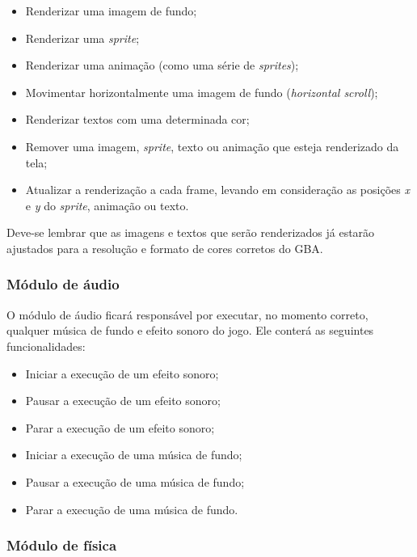       \begin{itemize}
        \item Renderizar uma imagem de fundo;
        \item Renderizar uma \textit{sprite};
        \item Renderizar uma animação (como uma série de \textit{sprites});
        \item Movimentar horizontalmente uma imagem de fundo (\textit{horizontal scroll});
        \item Renderizar textos com uma determinada cor;
        \item Remover uma imagem, \textit{sprite}, texto ou animação que esteja renderizado da tela;
        \item Atualizar a renderização a cada frame, levando em consideração as posições \textit{x} e \textit{y} do \textit{sprite}, animação ou texto.
      \end{itemize}

      Deve-se lembrar que as imagens e textos que serão renderizados já estarão ajustados para a resolução e formato de cores corretos do GBA.

    \subsubsection{Módulo de áudio}

      O módulo de áudio ficará responsável por executar, no momento correto, qualquer música de fundo e efeito sonoro do jogo. Ele conterá as seguintes funcionalidades:

      \begin{itemize}
        \item Iniciar a execução de um efeito sonoro;
        \item Pausar a execução de um efeito sonoro;
        \item Parar a execução de um efeito sonoro;
        \item Iniciar a execução de uma música de fundo;
        \item Pausar a execução de uma música de fundo;
        \item Parar a execução de uma música de fundo.
      \end{itemize}

    \subsubsection{Módulo de física}

